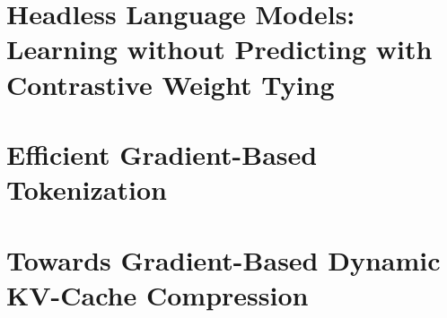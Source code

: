 \chapter{Headless Language Models: Learning without Predicting with Contrastive Weight Tying}
\label{chap:headless_lm}


\chapter{Efficient Gradient-Based Tokenization}
\label{chap:manta}


\chapter{Towards Gradient-Based Dynamic KV-Cache Compression}
\label{chap:kv_comp}